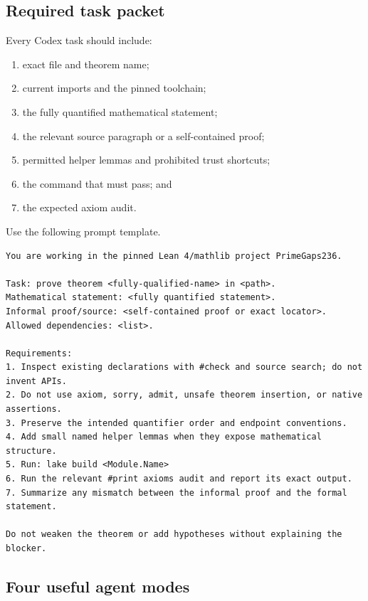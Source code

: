 \documentclass[11pt]{article}
\begin{document}
\subsection{Required task packet}

Every Codex task should include:

\begin{enumerate}
\item exact file and theorem name;
\item current imports and the pinned toolchain;
\item the fully quantified mathematical statement;
\item the relevant source paragraph or a self-contained proof;
\item permitted helper lemmas and prohibited trust shortcuts;
\item the command that must pass; and
\item the expected axiom audit.
\end{enumerate}

Use the following prompt template.

\begin{lstlisting}[language={}]
You are working in the pinned Lean 4/mathlib project PrimeGaps236.

Task: prove theorem <fully-qualified-name> in <path>.
Mathematical statement: <fully quantified statement>.
Informal proof/source: <self-contained proof or exact locator>.
Allowed dependencies: <list>.

Requirements:
1. Inspect existing declarations with #check and source search; do not invent APIs.
2. Do not use axiom, sorry, admit, unsafe theorem insertion, or native assertions.
3. Preserve the intended quantifier order and endpoint conventions.
4. Add small named helper lemmas when they expose mathematical structure.
5. Run: lake build <Module.Name>
6. Run the relevant #print axioms audit and report its exact output.
7. Summarize any mismatch between the informal proof and the formal statement.

Do not weaken the theorem or add hypotheses without explaining the blocker.
\end{lstlisting}

\subsection{Four useful agent modes}
\end{document}
